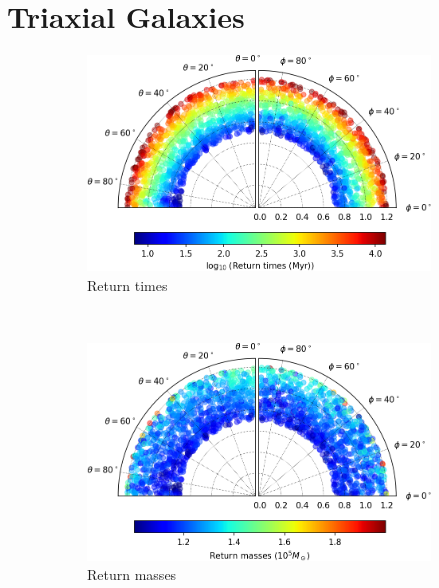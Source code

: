 \chapter{Triaxial Galaxies}\label{ch: Galaxies}

\begin{figure}[h]
    \centering
    \begin{subfigure}[t]{0.4\textwidth}
        \includegraphics[width = \textwidth]{"../Files/Week 13/images/20_time"}
        \caption{Return times}
    \end{subfigure}
    ~ 
    \begin{subfigure}[t]{0.4\textwidth}
        \includegraphics[width=\textwidth]{"../Files/Week 13/images/20_mass"}
        \caption{Return masses}
    \end{subfigure}
    \begin{subfigure}[t]{0.4\textwidth}

\end{subfigure}
\end{figure}
